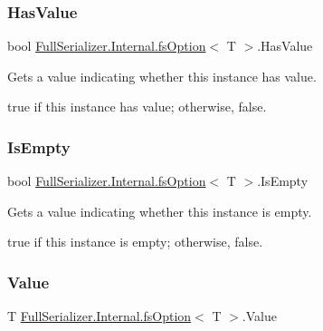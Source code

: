 \subsubsection{\texorpdfstring{Has\+Value}{HasValue}}
{\footnotesize\ttfamily bool \hyperlink{struct_full_serializer_1_1_internal_1_1fs_option}{Full\+Serializer.\+Internal.\+fs\+Option}$<$ T $>$.Has\+Value\hspace{0.3cm}{\ttfamily [get]}}



Gets a value indicating whether this instance has value. 

{\ttfamily true} if this instance has value; otherwise, {\ttfamily false}.\mbox{\label{struct_full_serializer_1_1_internal_1_1fs_option_a751a53374e8c4a4b9727dbf4f1af3f9e}} 
\subsubsection{\texorpdfstring{Is\+Empty}{IsEmpty}}
{\footnotesize\ttfamily bool \hyperlink{struct_full_serializer_1_1_internal_1_1fs_option}{Full\+Serializer.\+Internal.\+fs\+Option}$<$ T $>$.Is\+Empty\hspace{0.3cm}{\ttfamily [get]}}



Gets a value indicating whether this instance is empty. 

{\ttfamily true} if this instance is empty; otherwise, {\ttfamily false}.\mbox{\label{struct_full_serializer_1_1_internal_1_1fs_option_a7a047ed8e8e324add654a5c3620a97cd}} 
\subsubsection{\texorpdfstring{Value}{Value}}
{\footnotesize\ttfamily T \hyperlink{struct_full_serializer_1_1_internal_1_1fs_option}{Full\+Serializer.\+Internal.\+fs\+Option}$<$ T $>$.Value\hspace{0.3cm}{\ttfamily [get]}}



